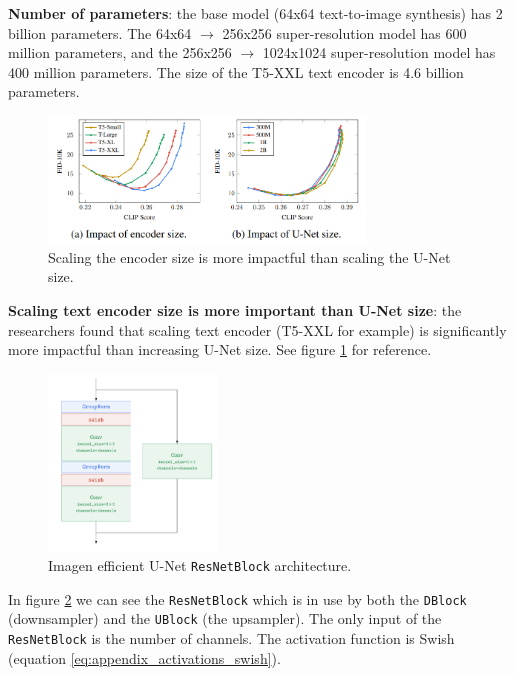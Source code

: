 \textbf{Number of parameters}: the base model (64x64 text-to-image synthesis) has 2 billion parameters. The 64x64 $\rightarrow$ 256x256 super-resolution model has 600 million parameters, and the 256x256 $\rightarrow$ 1024x1024 super-resolution model has 400 million parameters. The size of the T5-XXL text encoder is 4.6 billion parameters.

\begin{figure}
    \centering
    \includegraphics[width=0.75\textwidth]{images/imagen/encoder_vs_unet_size_impact.png}
    \caption{Scaling the encoder size is more impactful than scaling the U-Net size.}
    \label{fig:imagen_scaling_encoder_more_impactful_than_unet_scaling}
\end{figure}

\textbf{Scaling text encoder size is more important than U-Net size}: the researchers found that scaling text encoder (T5-XXL for example) is significantly more impactful than increasing U-Net size. See figure \ref{fig:imagen_scaling_encoder_more_impactful_than_unet_scaling} for reference.




\begin{figure}
    \centering
    \includegraphics[width=0.4\textwidth]{images/appendix/imagen/unet_resnetblock.png}
    \caption{Imagen efficient U-Net \texttt{ResNetBlock} architecture.}
    \label{fig:imagen_resnetblock}
\end{figure}

In figure \ref{fig:imagen_resnetblock} we can see the \texttt{ResNetBlock} which is in use by both the \texttt{DBlock} (downsampler) and the \texttt{UBlock} (the upsampler). The only input of the \texttt{ResNetBlock} is the number of channels. The activation function is Swish (equation \ref{eq:appendix_activations_swish}). 

